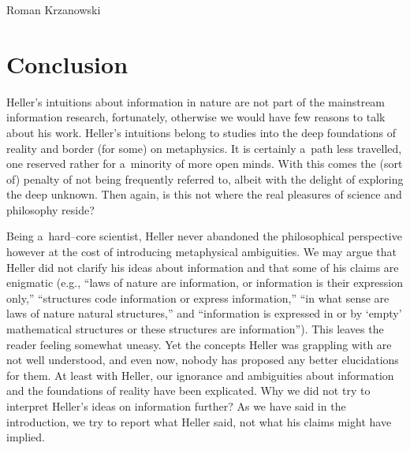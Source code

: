\begin{artengenv}{Roman Krzanowski}
\section{Conclusion}

Heller's intuitions about information in nature are not part of the mainstream information research, fortunately, otherwise we would have few reasons to talk about his work. Heller's intuitions belong to studies into the deep foundations of reality and border (for some) on metaphysics. It is certainly a~path less travelled, one reserved rather for a~minority of more open minds. With this comes the (sort of) penalty of not being frequently referred to, albeit with the delight of exploring the deep unknown. Then again, is this not where the real pleasures of science and philosophy reside?



Being a~hard–core scientist, Heller never abandoned the philosophical perspective 
\parencites[called by himself ‘philosophy in sciencesee][]{heller_how_2019}[][]{polak_philosophy_2019}[][]{polak_beyond_2022} %
 however at the cost of introducing metaphysical ambiguities. We may argue that Heller did not clarify his ideas about information and that some of his claims are enigmatic (e.g., ``laws of nature are information, or information is their expression only,'' ``structures code information or express information,'' ``in what sense are laws of nature natural structures,'' and ``information is expressed in or by ‘empty' mathematical structures or these structures are information''). This leaves the reader feeling somewhat uneasy. Yet the concepts Heller was grappling with are not well understood, and even now, nobody has proposed any better elucidations for them. At least with Heller, our ignorance and ambiguities about information and the foundations of reality have been explicated. Why we did not try to interpret Heller's ideas on information further? As we have said in the introduction, we try to report what Heller said, not what his claims might have implied.




\end{artengenv}
